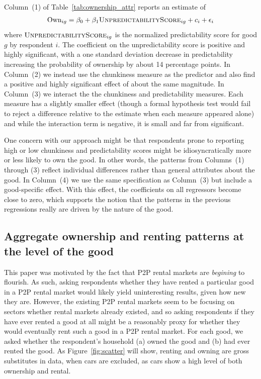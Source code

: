\documentclass[11pt]{article}
\begin{document}
Column~(1) of Table~\ref{tab:ownership_attr} reports an estimate of 
\begin{align}
  \text{Own}_{ig} = \beta_0 + \beta_1 \textsc{UnpredictabilityScore}_{ig} + c_i + \epsilon_i
\end{align} 
where $\textsc{UnpredictabilityScore}_{ig}$ is the normalized predictability score for good $g$ by respondent $i$.
The coefficient on the unpredictability score is positive and highly significant, with a one standard deviation decrease in predictability increasing the probability of ownership by about 14 percentage points. 
In Column~(2) we instead use the chunkiness measure as the predictor and also find a positive and highly significant effect of about the same magnitude. 
In Column~(3) we interact the the chunkiness and predictability measures.
Each measure has a slightly smaller effect (though a formal hypothesis test would fail to reject a difference relative to the estimate when each measure appeared alone) and while the interaction term is negative, it is small and far from significant.

One concern with our approach might be that respondents prone to reporting high or low chunkiness and predictability scores might be idiosyncratically more or less likely to own the good.
In other words, the patterns from Columns~(1) through (3) reflect individual differences rather than general attributes about the good.
In Column~(4) we use the same specification as Column~(3) but include a good-specific effect.
With this effect, the coefficients on all regressors become close to zero, which supports the notion that the patterns in the previous regressions really are driven by the nature of the good. 

\subsection{Aggregate ownership and renting patterns at the level of the good}

This paper was motivated by the fact that P2P rental markets are \emph{begining} to flourish.
As such, asking respondents whether they have rented a particular good in a P2P rental market would likely yield uninteresting results, given how new they are.
However, the existing P2P rental markets seem to be focusing on sectors whether rental markets already existed, and so asking respondents if they have ever rented a good at all might be a reasonably proxy for whether they would eventually rent such a good in a P2P rental market. 
For each good, we asked whether the respondent's household (a) owned the good and (b) had ever rented the good.
As Figure~\ref{fig:scatter} will show, renting and owning are gross substitutes in data, when cars are excluded, as cars show a high level of both ownership and rental. 
\end{document}
